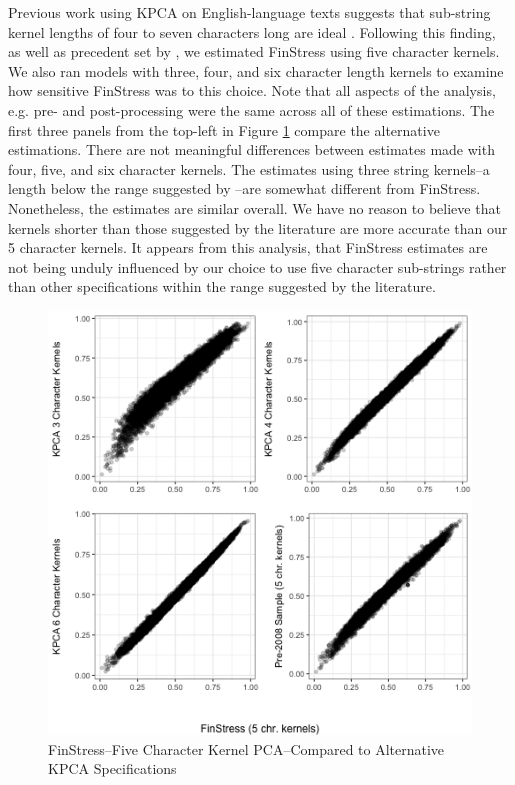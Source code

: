 \documentclass[]{article}
\begin{document}
Previous work using KPCA on English-language texts suggests that sub-string kernel lengths of four to seven characters long are ideal \citep{lodhi2002}. Following this finding, as well as precedent set by \cite{Spirling2012}, we estimated FinStress using five character kernels. We also ran models with three, four, and six character length kernels to examine how sensitive FinStress was to this choice. Note that all aspects of the analysis, e.g. pre- and post-processing were the same across all of these estimations. The first three panels from the top-left in Figure \ref{altKPCA} compare the alternative estimations. There are not meaningful differences between estimates made with four, five, and six character kernels. The estimates using three string kernels--a length below the range suggested by \cite{lodhi2002}--are somewhat different from FinStress. Nonetheless, the estimates are similar overall. We have no reason to believe that kernels shorter than those suggested by the literature are more accurate than our 5 character kernels. It appears from this analysis, that FinStress estimates are not being unduly influenced by our choice to use five character sub-strings rather than other specifications within the range suggested by the literature.

\begin{figure}
	\caption{FinStress--Five Character Kernel PCA--Compared to Alternative KPCA Specifications}
    \label{altKPCA}
    \begin{center}
    	\includegraphics[scale=0.5]{figures/kpca_n_lenth_compare.png}
    \end{center}

\end{figure}
\end{document}
